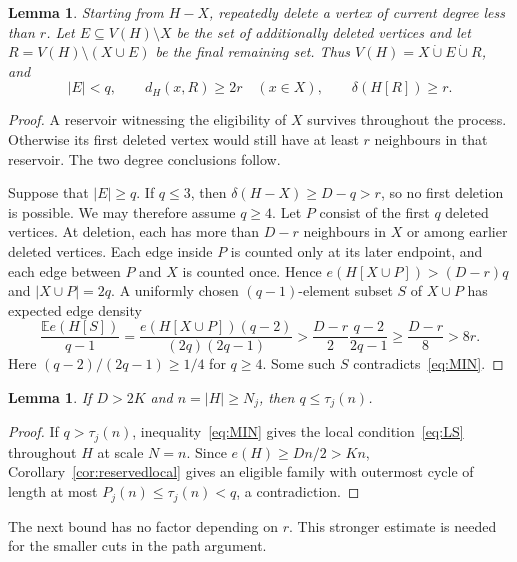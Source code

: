 \documentclass[10pt,letterpaper]{article}
\newtheorem{lemma}[theorem]{Lemma}
\theoremstyle{definition}
\theoremstyle{remark}
\newcommand{\dcup}{\mathbin{\dot\cup}}
\begin{document}
\begin{lemma}\label{lem:peelX}
Starting from $H-X$, repeatedly delete a vertex of current degree less than $r$. Let $E\subseteq V(H)\setminus X$ be the set of additionally deleted vertices and let $R=V(H)\setminus(X\cup E)$ be the final remaining set. Thus $V(H)=X\dcup E\dcup R$, and
\begin{equation}\label{eq:CORE}
|E|<q,\qquad
d_H(x,R)\ge2r\quad(x\in X),\qquad
\delta(H[R])\ge r.
\end{equation}
\end{lemma}
\begin{proof}
A reservoir witnessing the eligibility of $X$ survives throughout the process. Otherwise its first deleted vertex would still have at least $r$ neighbours in that reservoir. The two degree conclusions follow.

Suppose that $|E|\ge q$. If $q\le3$, then $\delta(H-X)\ge D-q>r$, so no first deletion is possible. We may therefore assume $q\ge4$. Let $P$ consist of the first $q$ deleted vertices. At deletion, each has more than $D-r$ neighbours in $X$ or among earlier deleted vertices. Each edge inside $P$ is counted only at its later endpoint, and each edge between $P$ and $X$ is counted once. Hence $e(H[X\cup P])>(D-r)q$ and $|X\cup P|=2q$. A uniformly chosen $(q-1)$-element subset $S$ of $X\cup P$ has expected edge density
\[
\frac{\mathbb E e(H[S])}{q-1}
=\frac{e(H[X\cup P])(q-2)}{(2q)(2q-1)}
>\frac{D-r}{2}\frac{q-2}{2q-1}
\ge\frac{D-r}{8}>8r.
\]
Here $(q-2)/(2q-1)\ge1/4$ for $q\ge4$. Some such $S$ contradicts~\eqref{eq:MIN}.
\end{proof}

\begin{lemma}\label{lem:shorteligible}
If $D>2K$ and $n=|H|\ge N_j$, then $q\le\tau_j(n)$.
\end{lemma}
\begin{proof}
If $q>\tau_j(n)$, inequality~\eqref{eq:MIN} gives the local condition~\eqref{eq:LS} throughout $H$ at scale $N=n$. Since $e(H)\ge Dn/2>Kn$, Corollary~\ref{cor:reservedlocal} gives an eligible family with outermost cycle of length at most $P_j(n)\le\tau_j(n)<q$, a contradiction.
\end{proof}

The next bound has no factor depending on $r$. This stronger estimate is needed for the smaller cuts in the path argument.
\end{document}
